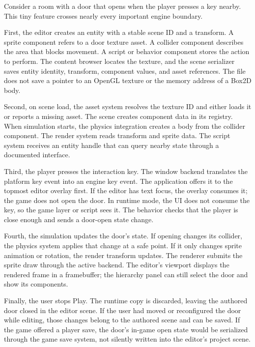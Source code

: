 \hypertarget{06-engine-ii-ch041-a-complete-worked-example-place-play-and-inspect-a-door}{}

Consider a room with a door that opens when the player presses a key nearby. This tiny feature crosses nearly every important engine boundary.

First, the editor creates an entity with a stable scene ID and a transform. A sprite component refers to a door texture asset. A collider component describes the area that blocks movement. A script or behavior component stores the action to perform. The content browser locates the texture, and the scene serializer saves entity identity, transform, component values, and asset references. The file does not save a pointer to an OpenGL texture or the memory address of a Box2D body.

Second, on scene load, the asset system resolves the texture ID and either loads it or reports a missing asset. The scene creates component data in its registry. When simulation starts, the physics integration creates a body from the collider component. The render system reads transform and sprite data. The script system receives an entity handle that can query nearby state through a documented interface.

Third, the player presses the interaction key. The window backend translates the platform key event into an engine key event. The application offers it to the topmost editor overlay first. If the editor has text focus, the overlay consumes it; the game does not open the door. In runtime mode, the UI does not consume the key, so the game layer or script sees it. The behavior checks that the player is close enough and sends a door-open state change.

Fourth, the simulation updates the door's state. If opening changes its collider, the physics system applies that change at a safe point. If it only changes sprite animation or rotation, the render transform updates. The renderer submits the sprite draw through the active backend. The editor's viewport displays the rendered frame in a framebuffer; the hierarchy panel can still select the door and show its components.

Finally, the user stops Play. The runtime copy is discarded, leaving the authored door closed in the editor scene. If the user had moved or reconfigured the door while editing, those changes belong to the authored scene and can be saved. If the game offered a player save, the door's in-game open state would be serialized through the game save system, not silently written into the editor's project scene.

